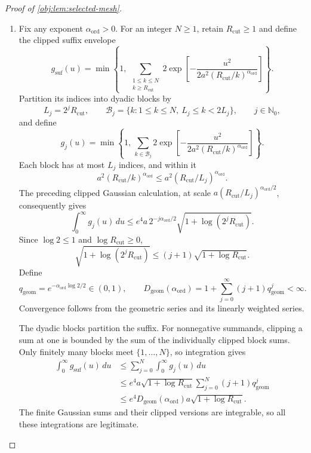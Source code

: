 \documentclass[11pt]{article}
\begin{document}
\begin{proof}[Proof of \cref{obj:lem:selected-mesh}]
\begin{enumerate}
\item Fix any exponent \(\alpha_{\mathrm{ord}}>0\). For an integer
\(N\ge1\), retain \(R_{\mathrm{cut}}\ge1\) and define the clipped suffix
envelope
\[
g_{\mathrm{suf}}(u)
=
\min\!\left\{1,\,
\sum_{\substack{1\le k\le N\\k\ge R_{\mathrm{cut}}}}
2\exp\!\left[
-\frac{u^2}{
2a^2(R_{\mathrm{cut}}/k)^{\alpha_{\mathrm{ord}}}}
\right]\right\}.
\]
Partition its indices into dyadic blocks by
\[
L_j=2^jR_{\mathrm{cut}},\qquad
\mathcal B_j
=
\{k:1\le k\le N,\ L_j\le k<2L_j\},
\qquad j\in\mathbb N_0,
\]
and define
\[
g_j(u)
=
\min\!\left\{1,\,
\sum_{k\in\mathcal B_j}
2\exp\!\left[
-\frac{u^2}{
2a^2(R_{\mathrm{cut}}/k)^{\alpha_{\mathrm{ord}}}}
\right]\right\}.
\]
Each block has at most \(L_j\) indices, and within it
\[
a^2(R_{\mathrm{cut}}/k)^{\alpha_{\mathrm{ord}}}
\le a^2(R_{\mathrm{cut}}/L_j)^{\alpha_{\mathrm{ord}}}.
\]
The preceding clipped Gaussian calculation, at scale
\(a(R_{\mathrm{cut}}/L_j)^{\alpha_{\mathrm{ord}}/2}\), consequently gives
\[
\int_0^\infty g_j(u)\,du
\le
e^4a\,2^{-j\alpha_{\mathrm{ord}}/2}
\sqrt{1+\log(2^jR_{\mathrm{cut}})}.
\]
Since \(\log2\le1\) and \(\log R_{\mathrm{cut}}\ge0\),
\[
\sqrt{1+\log(2^jR_{\mathrm{cut}})}
\le(j+1)\sqrt{1+\log R_{\mathrm{cut}}}.
\]
Define
\[
q_{\mathrm{geom}}
=
e^{-\alpha_{\mathrm{ord}}\log2/2}\in(0,1),
\qquad
D_{\mathrm{geom}}(\alpha_{\mathrm{ord}})
=
1+\sum_{j=0}^{\infty}(j+1)q_{\mathrm{geom}}^j<\infty.
\]
Convergence follows from the geometric series and its linearly weighted
series.

The dyadic blocks partition the suffix. For nonnegative summands,
clipping a sum at one is bounded by the sum of the individually clipped
block sums. Only finitely many blocks meet \(\{1,\ldots,N\}\), so
integration gives
\[
\begin{aligned}
\int_0^\infty g_{\mathrm{suf}}(u)\,du
&\le\sum_{j=0}^{N}\int_0^\infty g_j(u)\,du\\
&\le
e^4a\sqrt{1+\log R_{\mathrm{cut}}}
\sum_{j=0}^{N}(j+1)q_{\mathrm{geom}}^j\\
&\le
e^4D_{\mathrm{geom}}(\alpha_{\mathrm{ord}})
a\sqrt{1+\log R_{\mathrm{cut}}}.
\end{aligned}
\]
The finite Gaussian sums and their clipped versions are integrable, so
all these integrations are legitimate.


\end{enumerate}
\end{proof}
\end{document}

